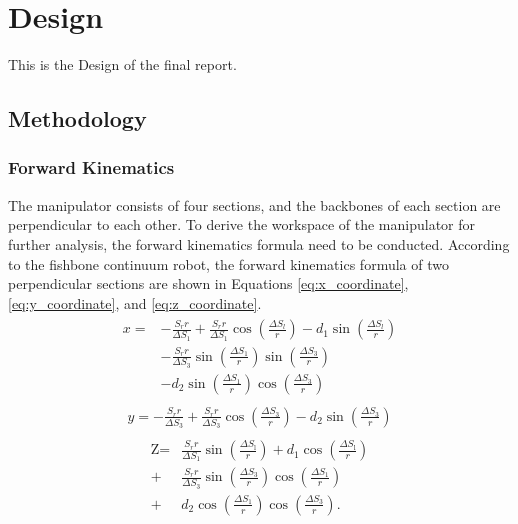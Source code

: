 \section{Design} 
This is the Design of the final report.
\subsection{Methodology}
\subsubsection{Forward Kinematics}
The manipulator consists of four sections, and the backbones of each section are perpendicular to each other. To derive the 
workspace of the manipulator for further analysis, the forward kinematics formula need to be conducted. According to the 
fishbone continuum robot\cite{fishboneCR}, the forward kinematics formula of two perpendicular sections are shown in 
Equations \ref{eq:x_coordinate}, \ref{eq:y_coordinate}, and \ref{eq:z_coordinate}.
\begin{align}
    \begin{aligned}
    x=&-\frac{S_{r}r}{\Delta S_{1}}+\frac{S_{r}r}{\Delta S_{1}}\cos\left(\frac{\Delta S_{l}}{r}\right)-d_{1}\sin\left(\frac{\Delta S_{l}}{r}\right) \\
    &-\frac{S_{r}r}{\Delta S_{3}}\sin\left(\frac{\Delta S_{1}}{r}\right)\sin\left(\frac{\Delta S_{3}}{r}\right) \\
    &-d_{2}\sin\left(\frac{\Delta S_{1}}{r}\right)\cos\left(\frac{\Delta S_{3}}{r}\right) 
    \end{aligned}
    \label{eq:x_coordinate}
\end{align}
\begin{align}
    \begin{aligned}
        y=-\frac{S_rr}{\Delta S_3}+\frac{S_rr}{\Delta S_3}\cos\left(\frac{\Delta S_3}{r}\right)-d_2\sin\left(\frac{\Delta S_3}{r}\right)
    \end{aligned}
    \label{eq:y_coordinate}
\end{align}
\begin{align}
    \begin{aligned}
        \text{Z} =&\frac{S_{r}r}{\Delta S_{1}}\sin\left(\frac{\Delta S_{\mathrm{l}}}{r}\right)+d_{1}\cos\left(\frac{\Delta S_{\mathrm{l}}}{r}\right) \\
        +&\frac{S_{r}r}{\Delta S_{3}}\sin\left(\frac{\Delta S_{3}}{r}\right)\cos\left(\frac{\Delta S_{1}}{r}\right) \\
        +&d_{2}\cos\left(\frac{\Delta S_{1}}{r}\right)\cos\left(\frac{\Delta S_{3}}{r}\right). 
    \end{aligned}
    \label{eq:z_coordinate}
\end{align}

